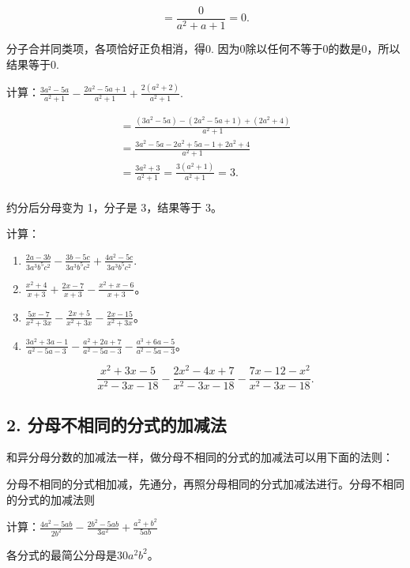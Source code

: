 \[
= \frac{0}{a ^{2} + a + 1} = 0.
\]

 分子合并同类项，各项恰好正负相消，得0.
因为0除以任何不等于0的数是0，所以结果等于0.

计算：\(\frac{3a^2 - 5a}{a^2 + 1} -\frac{2a^2 - 5a + 1}{a^2 + 1} +\frac{2(a^2 + 2)}{a^2 + 1}.\)

\[
\begin{array}{l} = \frac{(3 a ^{2} - 5 a) - (2 a ^{2} - 5 a + 1) + (2 a ^{2} + 4)}{a ^{2} + 1} \\ = \frac{3 a ^{2} - 5 a - 2 a ^{2} + 5 a - 1 + 2 a ^{2} + 4}{a ^{2} + 1} \\ = \frac{3 a ^{2} + 3}{a ^{2} + 1} = \frac{3 (a ^{2} + 1)}{a ^{2} + 1} = 3. \\ \end{array}
\]

 约分后分母变为 1，分子是 3，结果等于 3。

计算：

\begin{enumerate}[start=1]
\item
  \(\frac{2a - 3b}{3a^3b^5c^2} -\frac{3b - 5c}{3a^3b^5c^2} +\frac{4a^2 - 5c}{3a^3b^5c^2}.\)
\item
  \(\frac{x^2 + 4}{x + 3} + \frac{2x - 7}{x + 3} - \frac{x^2 + x - 6}{x + 3}\)。
\item
  \(\frac{5x - 7}{x^2 + 3x} - \frac{2x + 5}{x^2 + 3x} - \frac{2x - 15}{x^2 + 3x}\)。
\item
  \(\frac{3a^2 + 3a - 1}{a^2 - 5a - 3} - \frac{a^2 + 2a + 7}{a^2 - 5a - 3} - \frac{a^3 + 6a - 5}{a^2 - 5a - 3}\)。
\end{enumerate}

\[
\frac{x ^{2} + 3 x - 5}{x ^{2} - 3 x - 18} - \frac{2 x ^{2} - 4 x + 7}{x ^{2} - 3 x - 18} - \frac{7 x - 12 - x ^{2}}{x ^{2} - 3 x - 18}.
\]

\subsection{2. 分母不相同的分式的加减法}

和异分母分数的加减法一样，做分母不相同的分式的加减法可以用下面的法则：

分母不相同的分式相加减，先通分，再照分母相同的分式加减法进行。分母不相同的分式的加减法则

计算：\(\frac{4a^2 - 5ab}{2b^2} -\frac{2b^2 - 5ab}{3a^2} +\frac{a^2 + b^2}{5ab}\)

 各分式的最简公分母是\(30a^{2}b^{2}\)。

